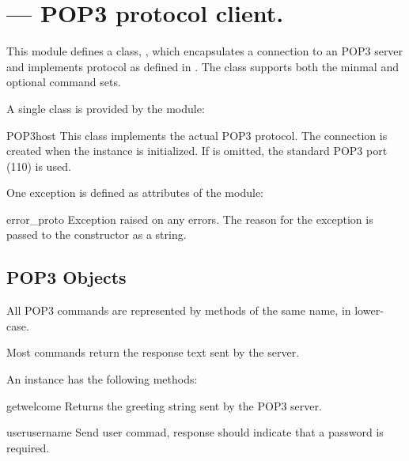 
\section{ ---
         POP3 protocol client.}



This module defines a class, , which encapsulates a
connection to an POP3 server and implements protocol as defined in
.  The  class supports both the minmal and
optional command sets.

A single class is provided by the  module:

\begin{classdesc}{POP3}{host}
This class implements the actual POP3 protocol.  The connection is
created when the instance is initialized.
If  is omitted, the standard POP3 port (110) is used.
\end{classdesc}

One exception is defined as attributes of the  module:

\begin{excdesc}{error_proto}
Exception raised on any errors.  The reason for the exception is
passed to the constructor as a string.
\end{excdesc}


\subsection{POP3 Objects}
\label{pop3-objects}

All POP3 commands are represented by methods of the same name,
in lower-case.

Most commands return the response text sent by the server.

An  instance has the following methods:


\begin{methoddesc}{getwelcome}{}
Returns the greeting string sent by the POP3 server.
\end{methoddesc}


\begin{methoddesc}{user}{username}
Send user commad, response should indicate that a password is required.
\end{methoddesc}

